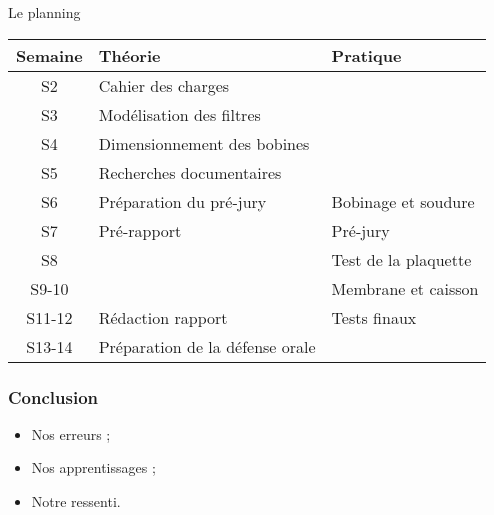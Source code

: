 \documentclass[pdf]{beamer}
\begin{document}
\begin{frame}{Le planning}
	\begin{table}[htb!]
		\centering
		\begin{tabularx}{\textwidth}{c|X|X}
		Semaine & Théorie 										& Pratique \\
		\hline
		S2 			& Cahier des charges 					&	\\
		\hline
		S3 			& Modélisation des filtres		&	\\
		\hline
		S4 			& Dimensionnement des bobines	&	\\
		\hline
		S5 			& Recherches documentaires 		& \\
		\hline
		S6 			& Préparation du pré-jury 		& Bobinage et soudure\\
		\hline
		S7 			& Pré-rapport 								& Pré-jury	\\
		\hline
		S8 			& 														& Test de la plaquette	\\
		\hline
		S9-10 	& 														& Membrane et caisson	\\
		\hline
		S11-12 	& Rédaction rapport 					& Tests finaux\\
		\hline
		S13-14 	& Préparation de la défense 
							orale 											&	\\
		\end{tabularx}
	\end{table}
\end{frame}

\begin{frame}
 \frametitle{Conclusion}
 \begin{itemize}
		\item Nos erreurs ;
		\item Nos apprentissages ;
		\item Notre ressenti.
 \end{itemize}
\end{frame}
\end{document}
